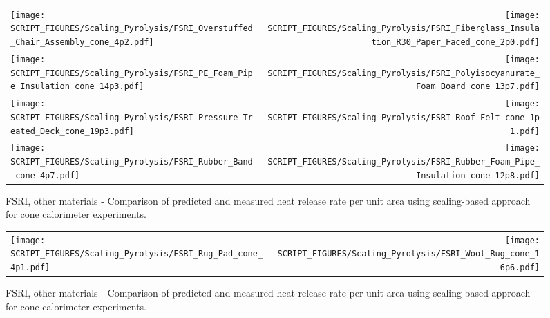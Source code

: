 \begin{figure}[p]
\begin{tabular*}{\textwidth}{l@{\extracolsep{\fill}}r}
\texttt{[image: SCRIPT\_FIGURES/Scaling\_Pyrolysis/FSRI\_Overstuffed\_Chair\_Assembly\_cone\_4p2.pdf]} &
\texttt{[image: SCRIPT\_FIGURES/Scaling\_Pyrolysis/FSRI\_Fiberglass\_Insulation\_R30\_Paper\_Faced\_cone\_2p0.pdf]} \\
\texttt{[image: SCRIPT\_FIGURES/Scaling\_Pyrolysis/FSRI\_PE\_Foam\_Pipe\_Insulation\_cone\_14p3.pdf]} &
\texttt{[image: SCRIPT\_FIGURES/Scaling\_Pyrolysis/FSRI\_Polyisocyanurate\_Foam\_Board\_cone\_13p7.pdf]} \\
\texttt{[image: SCRIPT\_FIGURES/Scaling\_Pyrolysis/FSRI\_Pressure\_Treated\_Deck\_cone\_19p3.pdf]} &
\texttt{[image: SCRIPT\_FIGURES/Scaling\_Pyrolysis/FSRI\_Roof\_Felt\_cone\_1p1.pdf]} \\
\texttt{[image: SCRIPT\_FIGURES/Scaling\_Pyrolysis/FSRI\_Rubber\_Band\_cone\_4p7.pdf]} &
\texttt{[image: SCRIPT\_FIGURES/Scaling\_Pyrolysis/FSRI\_Rubber\_Foam\_Pipe\_Insulation\_cone\_12p8.pdf]} \\
\end{tabular*}
\caption[HRRPUA of FSRI Materials using scaling model, others materials]
{FSRI, other materials - Comparison of predicted and measured heat release rate per unit area using scaling-based approach for cone calorimeter experiments.}
\label{FSRI_Materials_HRR_Others3}
\end{figure}

\begin{figure}[p]
\begin{tabular*}{\textwidth}{l@{\extracolsep{\fill}}r}
\texttt{[image: SCRIPT\_FIGURES/Scaling\_Pyrolysis/FSRI\_Rug\_Pad\_cone\_4p1.pdf]} &
\texttt{[image: SCRIPT\_FIGURES/Scaling\_Pyrolysis/FSRI\_Wool\_Rug\_cone\_16p6.pdf]} \\

\end{tabular*}
\caption[HRRPUA of FSRI Materials using scaling model, others materials]
{FSRI, other materials - Comparison of predicted and measured heat release rate per unit area using scaling-based approach for cone calorimeter experiments.}
\label{FSRI_Materials_HRR_Others4}
\end{figure}

\clearpage


